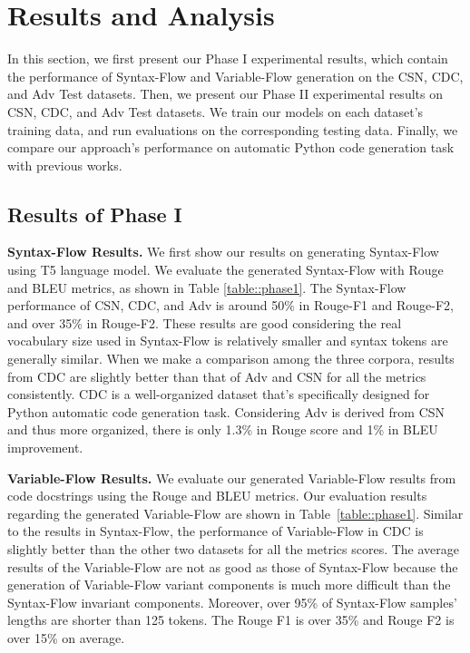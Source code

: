 \documentclass[11pt]{article}
\begin{document}
\section{Results and Analysis}
In this section, we first present our Phase I experimental results, which contain the performance of Syntax-Flow and Variable-Flow generation on the CSN, CDC, and Adv Test datasets. Then, we present our Phase II experimental results on CSN, CDC, and Adv Test datasets. We train our models on each dataset's training data, and run evaluations on the corresponding testing data. Finally, we compare our approach's performance on automatic Python code generation task with previous works.
 
\subsection{Results of Phase I}
\textbf{Syntax-Flow Results.} We first show our results on generating Syntax-Flow using T5 language model. We evaluate the generated Syntax-Flow with Rouge and BLEU metrics, as shown in Table \ref{table::phase1}. The Syntax-Flow performance of CSN, CDC, and Adv is around 50\% in Rouge-F1 and Rouge-F2, and over 35\% in Rouge-F2. These results are good considering the real vocabulary size used in Syntax-Flow is relatively smaller and syntax tokens are generally similar. When we make a comparison among the three corpora, results from CDC are slightly better than that of Adv and CSN for all the metrics consistently. CDC is a well-organized dataset that's specifically designed for Python automatic code generation task. Considering Adv is derived from CSN and thus more organized, there is only 1.3\% in Rouge score and 1\% in BLEU improvement.

\textbf{Variable-Flow Results.} We evaluate our generated Variable-Flow results from code docstrings using the Rouge and BLEU metrics. Our evaluation results regarding the generated Variable-Flow are shown in Table~\ref{table::phase1}. Similar to the results in Syntax-Flow, the performance of Variable-Flow in CDC is slightly better than the other two datasets for all the metrics scores. The average results of the Variable-Flow are not as good as those of Syntax-Flow because the generation of Variable-Flow variant components is much more difficult than the Syntax-Flow invariant components. Moreover, over 95\% of Syntax-Flow samples' lengths are shorter than 125 tokens. The Rouge F1 is over 35\% and Rouge F2 is over 15\% on average. 
\end{document}
